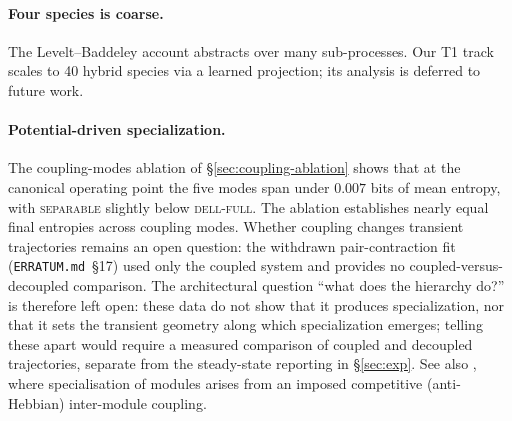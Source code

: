 \documentclass[11pt]{article}
\begin{document}
\paragraph{Four species is coarse.} The Levelt--Baddeley account abstracts
over many sub-processes. Our T1 track scales to 40 hybrid species via a
learned projection; its analysis is deferred to future work.

\paragraph{Potential-driven specialization.} The coupling-modes
ablation of \S\ref{sec:coupling-ablation} shows that at the canonical
operating point the five modes span under $0.007$ bits of mean
entropy, with \textsc{separable} slightly below \textsc{dell-full}.
The ablation establishes nearly equal final entropies across
coupling modes. Whether coupling changes transient trajectories
remains an open question: the withdrawn pair-contraction fit
(\texttt{ERRATUM.md}~\S17) used only the coupled system and provides
no coupled-versus-decoupled comparison. The architectural question
``what does the hierarchy do?'' is therefore left open: these data
do not show that it produces specialization, nor that it sets the
transient geometry along which specialization emerges; telling these
apart would require a measured comparison of coupled and decoupled
trajectories, separate from the steady-state reporting in
\S\ref{sec:exp}.
See also \cite{agliari2026networks,agliari2026modularrbm}, where
specialisation of modules arises from an imposed competitive
(anti-Hebbian) inter-module coupling.
\end{document}
